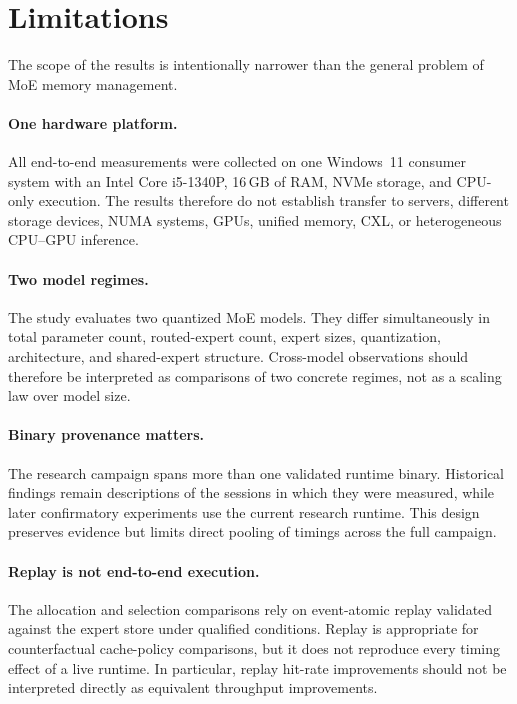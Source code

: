 \section{Limitations}
\label{sec:limitations}

The scope of the results is intentionally narrower than the general problem of MoE memory management.

\paragraph{One hardware platform.}
All end-to-end measurements were collected on one Windows~11 consumer system with an Intel Core i5-1340P, 16\,GB of RAM, NVMe storage, and CPU-only execution. The results therefore do not establish transfer to servers, different storage devices, NUMA systems, GPUs, unified memory, CXL, or heterogeneous CPU--GPU inference.

\paragraph{Two model regimes.}
The study evaluates two quantized MoE models. They differ simultaneously in total parameter count, routed-expert count, expert sizes, quantization, architecture, and shared-expert structure. Cross-model observations should therefore be interpreted as comparisons of two concrete regimes, not as a scaling law over model size.

\paragraph{Binary provenance matters.}
The research campaign spans more than one validated runtime binary. Historical findings remain descriptions of the sessions in which they were measured, while later confirmatory experiments use the current research runtime. This design preserves evidence but limits direct pooling of timings across the full campaign.

\paragraph{Replay is not end-to-end execution.}
The allocation and selection comparisons rely on event-atomic replay validated against the expert store under qualified conditions. Replay is appropriate for counterfactual cache-policy comparisons, but it does not reproduce every timing effect of a live runtime. In particular, replay hit-rate improvements should not be interpreted directly as equivalent throughput improvements.

